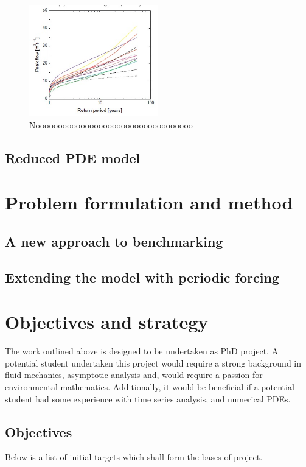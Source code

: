 \documentclass[11pt]{article}
\begin{document}
\begin{figure}[H]%
    \centering
    \includegraphics[width=0.5\textwidth]{Figs/concept_out.jpg}
    \caption{Nooooooooooooooooooooooooooooooooooo}
    \label{fig:concept_out}
\end{figure}




\subsection{Reduced PDE model}


\section{Problem formulation and method}

\subsection{A new approach to benchmarking}


\subsection{Extending the model with periodic forcing}

\section{Objectives and strategy}

The work outlined above is designed to be undertaken as PhD project. A potential student undertaken this project would require a strong background in fluid mechanics, asymptotic analysis and, would require a passion for environmental mathematics. 
Additionally, it would be beneficial if a potential student had some experience with time series analysis, and numerical PDEs.

\subsection{Objectives}
Below is a list of initial targets which shall form the bases of project.
\end{document}
